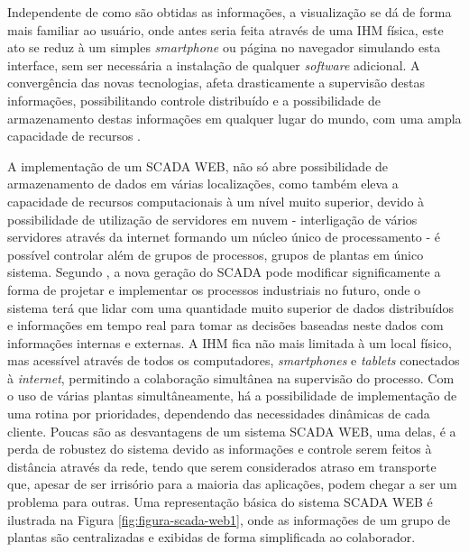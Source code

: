 \begin{figure}[!h]
{}	
\end{figure}

Independente de como são obtidas as informações, a visualização se dá de forma mais familiar ao usuário, onde antes seria feita através de uma \gls{IHM} física, este ato se reduz à um simples \textit{smartphone} ou página no navegador simulando esta interface, sem ser necessária a instalação de qualquer \textit{software} adicional. A convergência das novas tecnologias, afeta drasticamente a supervisão destas informações, possibilitando controle distribuído e a possibilidade de armazenamento destas informações em qualquer lugar do mundo, com uma ampla capacidade de recursos \cite{ScadaWebInterOp}.

A implementação de um \gls{SCADA} \gls{WEB}, não só abre possibilidade de armazenamento de dados em várias localizações, como também eleva a capacidade de recursos computacionais à um nível muito superior, devido à possibilidade de utilização de servidores em nuvem - interligação de vários servidores através da internet formando um núcleo único de processamento - é possível controlar além de grupos de processos, grupos de plantas em único sistema. Segundo \cite{ScadaNextGer}, a nova geração do \gls{SCADA} pode modificar significamente a forma de projetar e implementar os processos industriais no futuro, onde o sistema terá que lidar com uma quantidade muito superior de dados distribuídos e informações em tempo real para tomar as decisões baseadas neste dados com informações internas e externas. A \gls{IHM} fica não mais limitada à um local físico, mas acessível através de todos os computadores, \textit{smartphones} e \textit{tablets} conectados à \textit{internet}, permitindo a colaboração simultânea na supervisão do processo. Com o uso de várias plantas simultâneamente, há a possibilidade de implementação de uma rotina por prioridades, dependendo das necessidades dinâmicas de cada cliente.  Poucas são as desvantagens de um sistema \gls{SCADA} \gls{WEB}, uma delas, é a perda de robustez do sistema devido as informações e controle serem feitos à distância através da rede, tendo que serem considerados atraso em transporte que, apesar de ser irrisório para a maioria das aplicações, podem chegar a ser um problema para outras. Uma representação básica do sistema \gls{SCADA} \gls{WEB} é ilustrada na Figura \ref{fig:figura-scada-web1}, onde as informações de um grupo de plantas são centralizadas e exibidas de forma simplificada ao colaborador.


